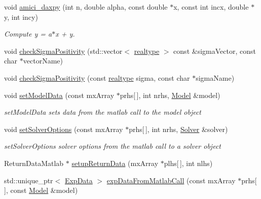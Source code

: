 \begin{DoxyCompactItemize}
\item 
void \mbox{\hyperlink{namespaceamici_ad4c586891a96a47c0a73f8585d6aabcf}{amici\+\_\+daxpy}} (int n, double alpha, const double $\ast$x, const int incx, double $\ast$y, int incy)
\begin{DoxyCompactList}\small\item\em Compute y = a$\ast$x + y. \end{DoxyCompactList}\item 
void \mbox{\hyperlink{namespaceamici_adc4a77886dc856d69a483188a54331db}{check\+Sigma\+Positivity}} (std\+::vector$<$ \mbox{\hyperlink{namespaceamici_a1bdce28051d6a53868f7ccbf5f2c14a3}{realtype}} $>$ const \&sigma\+Vector, const char $\ast$vector\+Name)
\item 
void \mbox{\hyperlink{namespaceamici_aaaf2890d0496acce04cdc1d00082dc8d}{check\+Sigma\+Positivity}} (const \mbox{\hyperlink{namespaceamici_a1bdce28051d6a53868f7ccbf5f2c14a3}{realtype}} sigma, const char $\ast$sigma\+Name)
\item 
void \mbox{\hyperlink{namespaceamici_aacdc2fc7895f234ad13713d2bd99870d}{set\+Model\+Data}} (const mx\+Array $\ast$prhs\mbox{[}$\,$\mbox{]}, int nrhs, \mbox{\hyperlink{classamici_1_1_model}{Model}} \&model)
\begin{DoxyCompactList}\small\item\em set\+Model\+Data sets data from the matlab call to the model object \end{DoxyCompactList}\item 
void \mbox{\hyperlink{namespaceamici_aab6be0027d918715e2ba50828088110b}{set\+Solver\+Options}} (const mx\+Array $\ast$prhs\mbox{[}$\,$\mbox{]}, int nrhs, \mbox{\hyperlink{classamici_1_1_solver}{Solver}} \&solver)
\begin{DoxyCompactList}\small\item\em set\+Solver\+Options solver options from the matlab call to a solver object \end{DoxyCompactList}\item 
Return\+Data\+Matlab $\ast$ \mbox{\hyperlink{namespaceamici_a91a3ac85998f7dd60d633882e9504b07}{setup\+Return\+Data}} (mx\+Array $\ast$plhs\mbox{[}$\,$\mbox{]}, int nlhs)
\item 
std\+::unique\+\_\+ptr$<$ \mbox{\hyperlink{classamici_1_1_exp_data}{Exp\+Data}} $>$ \mbox{\hyperlink{namespaceamici_a186dd3debfe185669f305464f161e4bb}{exp\+Data\+From\+Matlab\+Call}} (const mx\+Array $\ast$prhs\mbox{[}$\,$\mbox{]}, const \mbox{\hyperlink{classamici_1_1_model}{Model}} \&model)
\item 

\end{DoxyCompactItemize}
